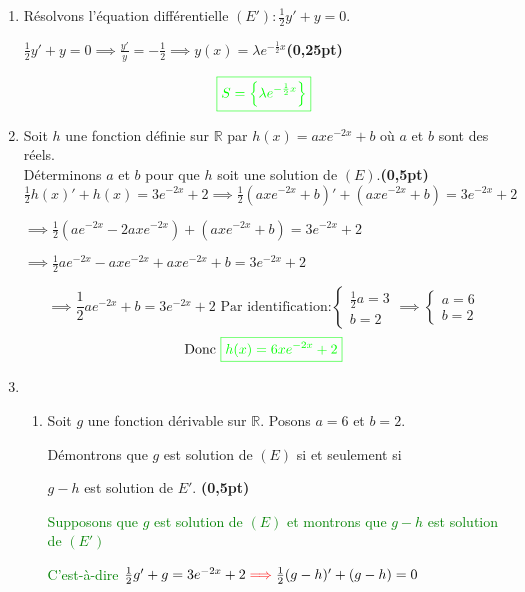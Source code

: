 \documentclass[12pt]{article}
\begin{document}
\renewcommand{\labelenumi}{\theenumi)}
\begin{enumerate}[label=\arabic*)]
    \item Résolvons l'équation différentielle \( (E'):\frac{1}{2}y'+y=0 \).
    
		    \( \frac{1}{2}y'+y=0 \implies \frac{y'}{y}=-\frac{1}{2} \implies y(x)=\lambda e^{-\frac{1}{2}x}\)\hfill \textbf{(0,25pt)}
    
    	   			\[\textcolor{green}{\boxed{S= \left\lbrace \lambda e^{-\frac{1}{2}x} \right\rbrace  }}\]
    	   			
    \item Soit $h$ une fonction définie sur $\mathbb{R}$ par $h(x)=axe^{-2x}+b$ où $a$ et $b$ sont  des réels.\\
        Déterminons $a$ et $b$ pour que $h$ soit une solution de $(E).$\hfill \textbf{(0,5pt)}
        \( \frac{1}{2}h(x)'+h(x)=3e^{-2x}+2 \implies \frac{1}{2}(axe^{-2x}+b)'+(axe^{-2x}+b)=3e^{-2x}+2 \)
        
        \( \implies \frac{1}{2}(ae^{-2x}-2axe^{-2x})+(axe^{-2x}+b)=3e^{-2x}+2 \)
        
        \( \implies \frac{1}{2}ae^{-2x}-axe^{-2x}+axe^{-2x}+b=3e^{-2x}+2 \)
        
        \[ 
        \implies \frac{1}{2}ae^{-2x}+b=3e^{-2x}+2\text{ Par identification:}
        \begin{cases}
        \frac{1}{2}a=3\\
        b=2
        \end{cases}\implies
        \begin{cases}
         a=6\\
         b=2
        \end{cases}
        \]
\[\text{Donc } \textcolor{green}{\boxed{h(x)=6xe^{-2x}+2}} \]
    \item
    \begin{enumerate}[label=\alph*)]
       \item Soit $g$ une fonction dérivable sur $\mathbb{R}.$ Posons $a=6$ et $b=2.$
       
        Démontrons que $g$ est solution de $(E)$ si et seulement si
        
         \( g-h \) est solution  de \( E' \). \hfill \textbf{(0,5pt)}
         
         \textcolor{green}{Supposons que \( g \) est solution de \( (E) \) et montrons que \( g-h \) est solution de \( (E') \) }
         
	   \textcolor{green}{C'est-à-dire  \( \frac{1}{2}g'+g = 3e^{-2x}+2  \textcolor{red}{\implies} \frac{1}{2}(g-h)'+(g-h)=0\)}       
	   

\end{enumerate}
\end{enumerate}
\end{document}
